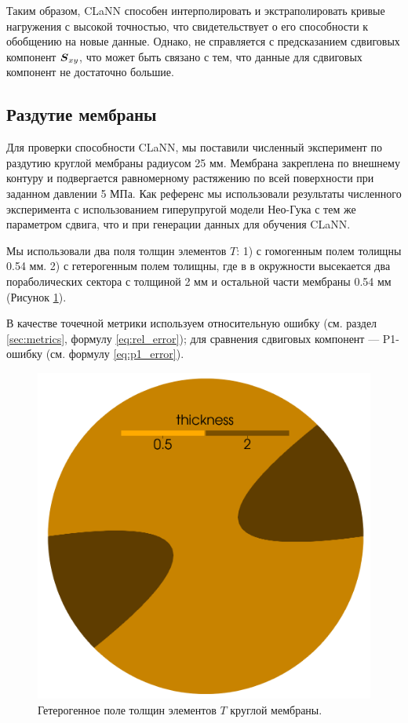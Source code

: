   Таким образом, CLaNN способен интерполировать и экстраполировать кривые нагружения с высокой точностью, что свидетельствует о его способности к обобщению на новые данные.
  Однако, не справляется с предсказанием сдвиговых компонент $\boldsymbol{S}_{xy}$, что может быть связано с тем, что данные для сдвиговых компонент не достаточно большие.
  
\subsection{Раздутие мембраны}

  Для проверки способности CLaNN, мы поставили численный эксперимент по раздутию круглой мембраны радиусом 25 мм.
  Мембрана закреплена по внешнему контуру и подвергается равномерному растяжению по всей поверхности при заданном давлении
  5 МПа. 
  Как референс мы использовали результаты численного эксперимента с использованием гиперупругой модели Нео-Гука с тем же параметром сдвига, 
  что и при генерации данных для обучения CLaNN.
  
  Мы использовали два поля толщин элементов $T$: 1) с гомогенным полем толищны 0.54 мм. 
  2) с гетерогенным полем толищны, где в в окружности высекается два пораболических сектора с толщиной 2 мм
  и остальной части мембраны 0.54 мм (Рисунок \ref{fig:membrane_thickness}). 

  В качестве точечной метрики используем относительную ошибку (см. раздел \ref{sec:metrics}, формулу \eqref{eq:rel_error});
  для сравнения сдвиговых компонент — P1-ошибку \cite{xie2024p1} (см. формулу \eqref{eq:p1_error}).

  \begin{figure}[H]
    \centering
    \includegraphics[width=0.25\linewidth]{img/het_circle.png}
    \caption{Гетерогенное поле толщин элементов $T$ круглой мембраны.}
    \label{fig:membrane_thickness}
  \end{figure}

